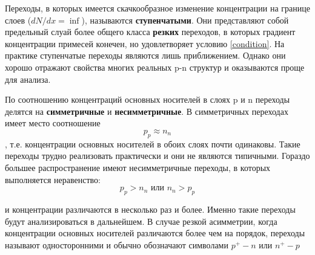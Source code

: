 Переходы, в которых имеется скачкообразное изменение концентрации на границе слоев ($dN/dx = \inf$), называются \textbf{ступенчатыми}. Они представляют собой предельный слуай более общего класса \textbf{резких} переходов, в которых градиент концентрации примесей конечен, но удовлетворяет условию \ref{condition}. На практике ступенчатые переходы являются лишь приближением. Однако они хорошо отражают свойства многих реальных p-n структур и оказываются проще для анализа.

По соотношению концентраций основных носителей в слоях p и n переходы делятся на \textbf{симметричные} и \textbf{несимметричные}. В симметричных переходах имеет место соотношение 
$$
p_p \approx n_n
$$,
т.е. концентрации основных носителей в обоих слоях почти одинаковы. Такие переходы трудно реализовать практически и они не являются типичными. Гораздо большее распространение имеют несимметричные переходы, в которых выполняется неравенство:
$$
p_p > n_n \textit{ или } n_n > p_p
$$

и концентрации различаются в несколько раз и более. Именно такие переходы будут анализироваться в дальнейшем. В случае резкой асимметрии, когда концентрации основных носителей различаются более чем на порядок, переходы называют односторонними и обычно обозначают символами $p^+-n$ или $n^+-p$





